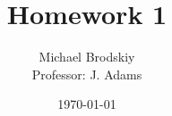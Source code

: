


\title{Homework 1}
\date{\today}
\author{Michael Brodskiy\\ \small Professor: J. Adams}



\maketitle


